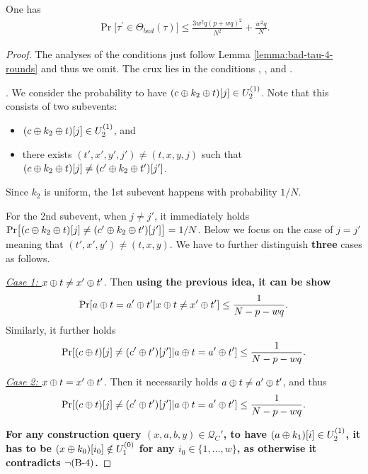 \begin{lemma}
	\label{lemma:bad-tau-6-rounds}
	
	One has
	\begin{align}
	{\Pr}\big[\tau^{\prime} \in \Theta_{bad}(\tau)\big] \leq \frac{3w^{2} q \left(p+w q\right)^{2}}{N^{2}} + \frac{w^{2} q}{N}.
	\label{eq:bound-bad-tau-6-rounds}
	\end{align}
\end{lemma}
\begin{proof}
The analyses of the conditions just follow Lemma \ref{lemma:bad-tau-4-rounds} and thus we omit. The crux lies in the conditions \cfour, \cfive, and \csix.




\arrangespace

\noindent \textsc{\cfour}. We consider the probability to have $(c\oplus k_2\oplus t)[j]\in U_2^{(1)}$. Note that this consists of two subevents:
\begin{itemize}
	\item $(c\oplus k_2\oplus t)[j]\in U_2^{(1)}$, and
	\item there exists $(t',x',y',j')\neq(t,x,y,j)$ such that $(c\oplus k_2\oplus t)[j]\neq(c'\oplus k_2\oplus t')[j']$.
\end{itemize}
Since $k_2$ is uniform, the 1st subevent happens with probability $1/N$.


For the 2nd subevent, when $j\neq j'$, it immediately holds ${\Pr}\big[(c\oplus k_2\oplus t)[j]\neq(c'\oplus k_2\oplus t')[j']\big]=1/N$. Below we focus on the case of $j=j'$ meaning that $(t',x',y')\neq(t,x,y)$. We have to further distinguish {\bf three} cases as follows.


\arrangespace

\noindent \textit{\underline{Case 1: $x\oplus t\neq x'\oplus t'$}}. Then {\bf using the previous idea, it can be show}
%
$$\Pr[a\oplus t=a'\oplus t'|x\oplus t\neq x'\oplus t']\leq\frac{1}{N-p-wq}.$$
%
Similarly, it further holds
%
$$\Pr[(c\oplus t)[j]\neq(c'\oplus t')[j']|a\oplus t=a'\oplus t']\leq\frac{1}{N-p-wq}.$$
%


\arrangespace

\noindent \textit{\underline{Case 2: $x\oplus t=x'\oplus t'$}}. Then it necessarily holds $a\oplus t\neq a'\oplus t'$, and thus
%
$$\Pr[(c\oplus t)[j]\neq(c'\oplus t')[j']|a\oplus t=a'\oplus t']\leq\frac{1}{N-p-wq}.$$
%



\arrangespace



\textbf{For any construction query $(x,a,b,y)\in\mathcal{Q}_C'$, to have $(a\oplus k_1)[i]\in U_2^{(1)}$, it has to be $(x\oplus k_0)[i_0]\notin U_1^{(0)}$ for any $i_0\in\{1,\ldots,w\}$, as otherwise it contradicts $\neg\text{(B-4)}$.}



\end{proof}
